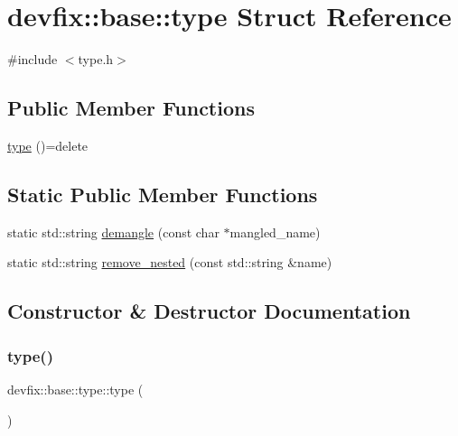 \hypertarget{structdevfix_1_1base_1_1type}{}\section{devfix\+:\+:base\+:\+:type Struct Reference}
\label{structdevfix_1_1base_1_1type}


{\ttfamily \#include $<$type.\+h$>$}

\subsection*{Public Member Functions}
\begin{DoxyCompactItemize}
\item 
\hyperlink{structdevfix_1_1base_1_1type_aedbe0f20a35aa5dc6165eb552f132844}{type} ()=delete
\end{DoxyCompactItemize}
\subsection*{Static Public Member Functions}
\begin{DoxyCompactItemize}
\item 
static std\+::string \hyperlink{structdevfix_1_1base_1_1type_a51dfa5bc70b1befb7f877ab11ad59215}{demangle} (const char $\ast$mangled\+\_\+name)
\item 
static std\+::string \hyperlink{structdevfix_1_1base_1_1type_ab0805a0df723803b9e56a8bd63b64dc8}{remove\+\_\+nested} (const std\+::string \&name)
\end{DoxyCompactItemize}


\subsection{Constructor \& Destructor Documentation}
\mbox{\label{structdevfix_1_1base_1_1type_aedbe0f20a35aa5dc6165eb552f132844}} 
\subsubsection{\texorpdfstring{type()}{type()}}
{\footnotesize\ttfamily devfix\+::base\+::type\+::type (\begin{DoxyParamCaption}{ }\end{DoxyParamCaption})\hspace{0.3cm}{\ttfamily [delete]}}



